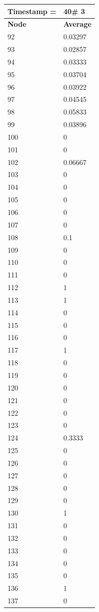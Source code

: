 \begin{tabular}{|l||l|}
\hline
\textbf{Timestamp =} & \textbf{40}\# 3\\\hline
	\textbf{Node} & \textbf{Average} \\ \hline
\hline
	92 & 0.03297 \\ \hline
	93 & 0.02857 \\ \hline
	94 & 0.03333 \\ \hline
	95 & 0.03704 \\ \hline
	96 & 0.03922 \\ \hline
	97 & 0.04545 \\ \hline
	98 & 0.05833 \\ \hline
	99 & 0.03896 \\ \hline
	100 & 0 \\ \hline
	101 & 0 \\ \hline
	102 & 0.06667 \\ \hline
	103 & 0 \\ \hline
	104 & 0 \\ \hline
	105 & 0 \\ \hline
	106 & 0 \\ \hline
	107 & 0 \\ \hline
	108 & 0.1 \\ \hline
	109 & 0 \\ \hline
	110 & 0 \\ \hline
	111 & 0 \\ \hline
	112 & 1 \\ \hline
	113 & 1 \\ \hline
	114 & 0 \\ \hline
	115 & 0 \\ \hline
	116 & 0 \\ \hline
	117 & 1 \\ \hline
	118 & 0 \\ \hline
	119 & 0 \\ \hline
	120 & 0 \\ \hline
	121 & 0 \\ \hline
	122 & 0 \\ \hline
	123 & 0 \\ \hline
	124 & 0.3333 \\ \hline
	125 & 0 \\ \hline
	126 & 0 \\ \hline
	127 & 0 \\ \hline
	128 & 0 \\ \hline
	129 & 0 \\ \hline
	130 & 1 \\ \hline
	131 & 0 \\ \hline
	132 & 0 \\ \hline
	133 & 0 \\ \hline
	134 & 0 \\ \hline
	135 & 0 \\ \hline
	136 & 1 \\ \hline
	137 & 0 \\ \hline
\end{tabular}

